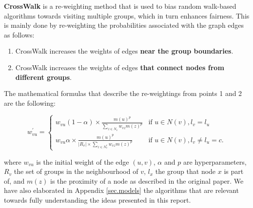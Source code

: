 \textbf{CrossWalk} is a re-weighting method that is used to bias random walk-based algorithms towards visiting multiple groups, which in turn enhances fairness. This is mainly done by re-weighting the probabilities associated with the graph edges as follows:
\vspace{-1mm}

\begin{enumerate}
\item CrossWalk increases the weights of edges \textbf{near the group boundaries}.
\item CrossWalk increases the weights of edges \textbf{that connect nodes from different groups}. 
\end{enumerate}
\vspace{-1mm}

The mathematical formulas that describe the re-weightings from points 1 and 2 are the following: 
\vspace{-1mm}

\begin{equation}
w_{vu}^{'} = \begin{cases} w_{vu}(1-\alpha) \times \frac{m(u)^p}{\sum\limits_{z \in N_v} w_{vz}m(z)^p} & \text{if } u \in N(v), l_v = l_u \\
w_{vu}\alpha \times \frac{m(u)^p}{|R_{v}| \times \sum\limits_{z \in N_{v}^c} w_{vz}m(z)^p} & \text{if } u \in N(v), l_v \neq l_u = c.
\end{cases}
\end{equation}
\vspace{-1mm}

where $w_{vu}$ is the initial weight of the edge $(u,v)$, $\alpha$ and $p$ are hyperparameters, $R_{v}$ the set of groups in the neighbourhood of $v$, $l_{x}$ the group that node $x$ is part of, and $m(z)$ is the proximity of a node as described in the original paper.
We have also elaborated in Appendix \ref{sec.models} the algorithms that are relevant towards fully understanding the ideas presented in this report.\vspace{-2.8mm}


        

